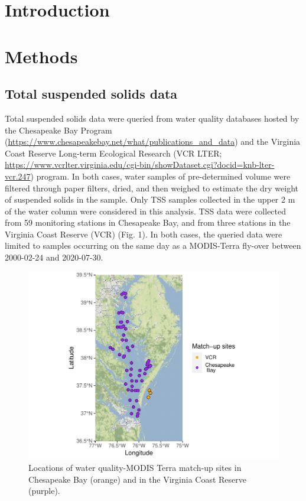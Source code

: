 \documentclass[11pt,]{article}
\begin{document}
\vskip -8.5pt



\noindent  

\hypertarget{introduction}{%
\section{Introduction}\label{introduction}}

\hypertarget{methods}{%
\section{Methods}\label{methods}}

\hypertarget{total-suspended-solids-data}{%
\subsection{Total suspended solids
data}\label{total-suspended-solids-data}}

Total suspended solids data were queried from water quality databases
hosted by the Chesapeake Bay Program
(\url{https://www.chesapeakebay.net/what/publications_and_data}) and the
Virginia Coast Reserve Long-term Ecological Research (VCR LTER;
\url{https://www.vcrlter.virginia.edu/cgi-bin/showDataset.cgi?docid=knb-lter-vcr.247})
program. In both cases, water samples of pre-determined volume were
filtered through paper filters, dried, and then weighed to estimate the
dry weight of suspended solids in the sample. Only TSS samples collected
in the upper 2 m of the water column were considered in this analysis.
TSS data were collected from 59 monitoring stations in Chesapeake Bay,
and from three stations in the Virginia Coast Reserve (VCR) (Fig. 1). In
both cases, the queried data were limited to samples occurring on the
same day as a MODIS-Terra fly-over between 2000-02-24 and 2020-07-30.

\begin{figure}
\centering
\includegraphics{ssrs_sp2020_files/figure-latex/cb-map1-1.pdf}
\caption{Locations of water quality-MODIS Terra match-up sites in
Chesapeake Bay (orange) and in the Virginia Coast Reserve (purple).}
\end{figure}

\newpage
\singlespacing 
\end{document}
